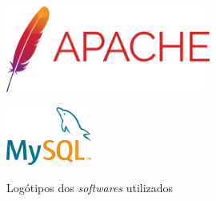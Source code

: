 \documentclass[11pt,twoside,a4paper]{report}
\begin{document}
\begin{figure}[H]
\begin{minipage}{0.33\textwidth}
	\end{minipage}%
	\begin{minipage}{0.33\textwidth}
		\vspace{1.1cm}
		\begin{center}
			\includegraphics[width=0.6\textwidth]{apache} %
			\label{fig:apache}
		\end{center}
	\end{minipage}
	\begin{minipage}{1\textwidth}
		\vspace{0.5cm}
		\begin{center}
			\includegraphics[width=0.25\textwidth]{mysql} %
			\label{fig:mysql}
		\end{center}
	\end{minipage}
	\caption{Logótipos dos \textit{softwares} utilizados}
	\label{fig:softwares}
\end{figure}
\end{document}
